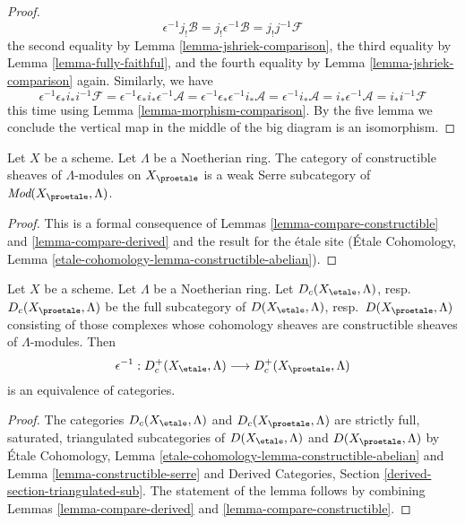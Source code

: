 \begin{proof}
$$\epsilon^{-1}j_!\mathcal{B} =
j_!\epsilon^{-1}\mathcal{B} =
j_!j^{-1}\mathcal{F}
$$
the second equality by Lemma \ref{lemma-jshriek-comparison},
the third equality by Lemma \ref{lemma-fully-faithful}, and the
fourth equality by Lemma \ref{lemma-jshriek-comparison} again.
Similarly, we have
$$
\epsilon^{-1}\epsilon_*i_*i^{-1}\mathcal{F} =
\epsilon^{-1}\epsilon_*i_*\epsilon^{-1}\mathcal{A} =
\epsilon^{-1}\epsilon_*\epsilon^{-1}i_*\mathcal{A} =
\epsilon^{-1}i_*\mathcal{A} =
i_*\epsilon^{-1}\mathcal{A} =
i_*i^{-1}\mathcal{F}
$$
this time using Lemma \ref{lemma-morphism-comparison}.
By the five lemma we conclude the
vertical map in the middle of the big diagram is an isomorphism.
\end{proof}

\begin{lemma}
\label{lemma-constructible-serre}
Let $X$ be a scheme. Let $\Lambda$ be a Noetherian ring.
The category of constructible sheaves of $\Lambda$-modules on $X_\proetale$
is a weak Serre subcategory of $\textit{Mod}(X_\proetale, \Lambda)$.
\end{lemma}

\begin{proof}
This is a formal consequence of
Lemmas \ref{lemma-compare-constructible} and \ref{lemma-compare-derived}
and the result for the \'etale site
(\'Etale Cohomology, Lemma \ref{etale-cohomology-lemma-constructible-abelian}).
\end{proof}

\begin{lemma}
\label{lemma-compare-constructible-derived}
Let $X$ be a scheme. Let $\Lambda$ be a Noetherian ring.
Let $D_c(X_\etale, \Lambda)$, resp.\ $D_c(X_\proetale, \Lambda)$
be the full subcategory of
$D(X_\etale, \Lambda)$, resp.\ $D(X_\proetale, \Lambda)$
consisting of those complexes whose cohomology sheaves are
constructible sheaves of $\Lambda$-modules. Then
$$
\epsilon^{-1} :
D_c^+(X_\etale, \Lambda)
\longrightarrow
D_c^+(X_\proetale, \Lambda)
$$
is an equivalence of categories.
\end{lemma}

\begin{proof}
The categories $D_c(X_\etale, \Lambda)$ and $D_c(X_\proetale, \Lambda)$
are strictly full, saturated, triangulated subcategories of
$D(X_\etale, \Lambda)$ and $D(X_\proetale, \Lambda)$ by
\'Etale Cohomology, Lemma \ref{etale-cohomology-lemma-constructible-abelian}
and
Lemma \ref{lemma-constructible-serre}
and
Derived Categories, Section \ref{derived-section-triangulated-sub}.
The statement of the lemma follows by combining
Lemmas \ref{lemma-compare-derived} and
\ref{lemma-compare-constructible}.
\end{proof}

